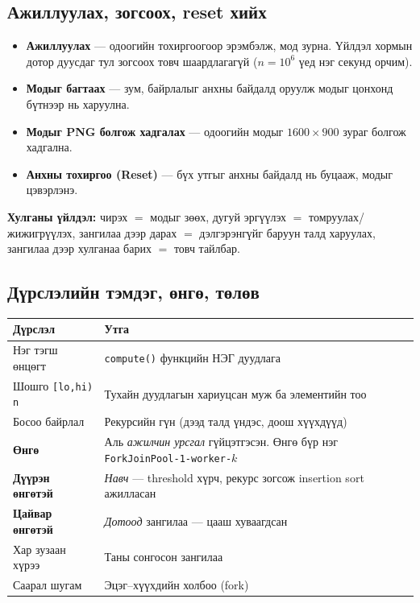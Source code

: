\documentclass[11pt,a4paper]{article}
\begin{document}
\subsection{Ажиллуулах, зогсоох, reset хийх}
\begin{itemize}[nosep,leftmargin=*]
  \item \textbf{Ажиллуулах} --- одоогийн тохиргоогоор эрэмбэлж, мод зурна.
        Үйлдэл хормын дотор дуусдаг тул зогсоох товч шаардлагагүй
        ($n = 10^6$ үед нэг секунд орчим).
  \item \textbf{Модыг багтаах} --- зум, байрлалыг анхны байдалд оруулж модыг
        цонхонд бүтнээр нь харуулна.
  \item \textbf{Модыг PNG болгож хадгалах} --- одоогийн модыг $1600\times900$
        зураг болгож хадгална.
  \item \textbf{Анхны тохиргоо (Reset)} --- бүх утгыг анхны байдалд нь
        буцааж, модыг цэвэрлэнэ.
\end{itemize}

\textbf{Хулганы үйлдэл:} чирэх $=$ модыг зөөх, дугуй эргүүлэх $=$ томруулах/жижигрүүлэх,
зангилаа дээр дарах $=$ дэлгэрэнгүйг баруун талд харуулах, зангилаа дээр
хулганаа барих $=$ товч тайлбар.

\subsection{Дүрслэлийн тэмдэг, өнгө, төлөв}

\begin{center}
\small
\begin{tabular}{L{4.2cm}L{10.3cm}}
\toprule
Дүрслэл & Утга \\
\midrule
Нэг тэгш өнцөгт & \texttt{compute()} функцийн НЭГ дуудлага \\
Шошго \texttt{[lo,hi) n} & Тухайн дуудлагын хариуцсан муж ба элементийн тоо \\
Босоо байрлал & Рекурсийн гүн (дээд талд үндэс, доош хүүхдүүд) \\
\textbf{Өнгө} & Аль \emph{ажилчин урсгал} гүйцэтгэсэн. Өнгө бүр нэг
\texttt{ForkJoinPool-1-worker-$k$} \\
\textbf{Дүүрэн өнгөтэй} & \emph{Навч} --- threshold хүрч, рекурс зогсож
insertion sort ажилласан \\
\textbf{Цайвар өнгөтэй} & \emph{Дотоод} зангилаа --- цааш хуваагдсан \\
Хар зузаан хүрээ & Таны сонгосон зангилаа \\
Саарал шугам & Эцэг--хүүхдийн холбоо (fork) \\
\bottomrule
\end{tabular}
\end{center}
\end{document}
